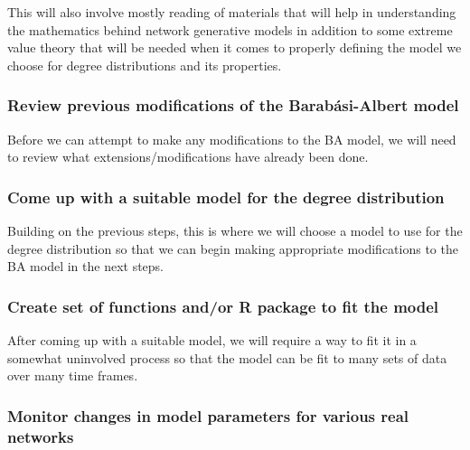 \documentclass[
]{article}
\begin{document}
This will also involve mostly reading of materials that will help in
understanding the mathematics behind network generative models in
addition to some extreme value theory that will be needed when it comes
to properly defining the model we choose for degree distributions and
its properties.

\hypertarget{review-previous-modifications-of-the-barabuxe1si-albert-model}{%
\subsubsection*{Review previous modifications of the Barabási-Albert
model}\label{review-previous-modifications-of-the-barabuxe1si-albert-model}}

Before we can attempt to make any modifications to the BA model, we will
need to review what extensions/modifications have already been done.

\hypertarget{come-up-with-a-suitable-model-for-the-degree-distribution}{%
\subsubsection*{Come up with a suitable model for the degree
distribution}\label{come-up-with-a-suitable-model-for-the-degree-distribution}}

Building on the previous steps, this is where we will choose a model to
use for the degree distribution so that we can begin making appropriate
modifications to the BA model in the next steps.

\hypertarget{create-set-of-functions-andor-r-package-to-fit-the-model}{%
\subsubsection*{Create set of functions and/or R package to fit the
model}\label{create-set-of-functions-andor-r-package-to-fit-the-model}}

After coming up with a suitable model, we will require a way to fit it
in a somewhat uninvolved process so that the model can be fit to many
sets of data over many time frames.

\hypertarget{monitor-changes-in-model-parameters-for-various-real-networks}{%
\subsubsection*{Monitor changes in model parameters for various real
networks}\label{monitor-changes-in-model-parameters-for-various-real-networks}}
\end{document}
